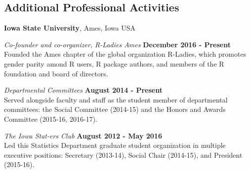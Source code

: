 \documentclass[margin,line]{res}
\begin{document}
\begin{resume}

\section{\sc Additional Professional Activities}

{\bf Iowa State University}, Ames, Iowa USA

\vspace{-.3cm}

{\em Co-founder and co-organizer, R-Ladies Ames} \hfill {\bf December 2016 - Present}\\
Founded the Ames chapter of the global organization R-Ladies, which promotes gender parity amond R users, R package authors, and members of the R foundation and board of directors. 

{\em Departmental Committees} \hfill {\bf August 2014 - Present}\\
Served alongside faculty and staff as the student member of departmental committees: the Social Committee (2014-15) and the Honors and Awards Committee (2015-16, 2016-17). 

{\em The Iowa Stat-ers Club} \hfill {\bf August 2012 - May 2016}\\
Led this Statistics Department graduate student organization in multiple executive positions: Secretary (2013-14), Social Chair (2014-15), and President (2015-16).




\end{resume}
\end{document}
